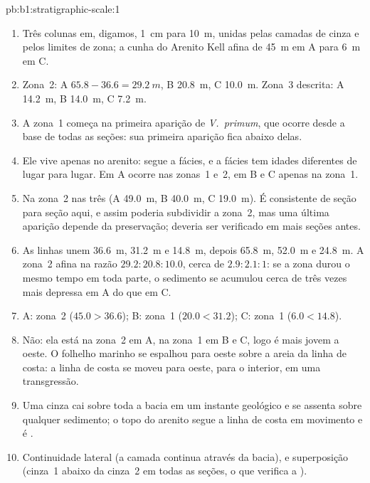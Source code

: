 \begin{solution}{pb:b1:stratigraphic-scale:1}
\begin{enumerate}
  \item Três colunas em, digamos, \qty{1}{cm} para \qty{10}{m}, unidas pelas camadas de cinza e
        pelos limites de zona; a cunha do Arenito Kell afina de \qty{45}{m} em A para
        \qty{6}{m} em C.
  \item Zona~2: A $65.8 - 36.6 = \qty{29.2}{m}$, B \qty{20.8}{m}, C
        \qty{10.0}{m}. Zona~3 descrita: A \qty{14.2}{m}, B \qty{14.0}{m}, C
        \qty{7.2}{m}.
  \item A zona~1 começa na primeira aparição de \emph{V.~primum}, que ocorre desde a base
        de todas as seções: sua primeira aparição fica abaixo delas.
  \item Ele vive apenas no arenito: segue a fácies, e a fácies tem idades diferentes de lugar
        para lugar. Em A ocorre nas zonas~1 e~2, em B e C apenas na zona~1.
  \item Na zona~2 nas três (A \qty{49.0}{m}, B \qty{40.0}{m}, C \qty{19.0}{m}). É consistente
        de seção para seção aqui, e assim poderia subdividir a zona~2, mas uma última aparição
        depende da preservação; deveria ser verificado em mais seções antes.
  \item As linhas unem \qty{36.6}{m}, \qty{31.2}{m} e \qty{14.8}{m}, depois \qty{65.8}{m},
        \qty{52.0}{m} e \qty{24.8}{m}. A zona~2 afina na razão $29.2 : 20.8 : 10.0$, cerca de
        $2.9 : 2.1 : 1$: se a zona durou o mesmo tempo em toda parte, o sedimento se acumulou
        cerca de três vezes mais depressa em A do que em C.
  \item A: zona~2 ($45.0 > 36.6$); B: zona~1 ($20.0 < 31.2$); C: zona~1
        ($6.0 < 14.8$).
  \item Não: ela está na zona~2 em A, na zona~1 em B e C, logo é mais jovem a oeste. O folhelho
        marinho se espalhou para oeste sobre a areia da linha de costa: a linha de costa se moveu
        para oeste, para o interior, em uma transgressão.
  \item Uma cinza cai sobre toda a bacia em um instante geológico e se assenta sobre qualquer
        sedimento; o topo do arenito segue a linha de costa em movimento e é .
  \item Continuidade lateral (a camada continua através da bacia), e superposição (cinza~1
        abaixo da cinza~2 em todas as seções, o que verifica a ).

\end{enumerate}
\end{solution}
